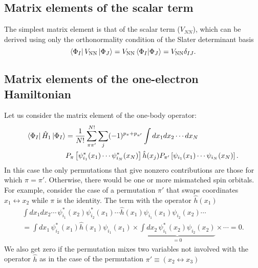 \documentclass[../Main/chem532-notes.tex]{subfiles}
\begin{document}
\subsection{Matrix elements of the scalar term}
The simplest matrix element is that of the scalar term ($V_{NN}$), which can be derived using only the orthonormality condition of the Slater determinant basis
\begin{equation}
\bra{\Phi_I} V_\mathrm{NN} \ket{\Phi_J}
= V_\mathrm{NN} \braket{\Phi_I | \Phi_J} = V_\mathrm{NN} \delta_{IJ}.
\end{equation}

\subsection{Matrix elements of the one-electron Hamiltonian}
Let us consider the matrix element of the one-body operator:
\begin{equation}
\begin{split}
\bra{\Phi_I} \hat{H}_1 \ket{\Phi_I} &= \frac{1}{N!}
\sum_{\pi \pi'}^{N!} \sum_j (-1)^{p_\pi + p_{\pi'}} \int dx_1 dx_2 \cdots dx_N \\
&
P_{\pi}\left[
\psi_{i_1}^{*}(x_1) \cdots \psi_{i_N}^{*}(x_N)
\right]
\hat{h}(x_j)
P_{\pi'}\left[
\psi_{i_1}(x_1) \cdots \psi_{i_N}(x_N)
\right].
\end{split}
\end{equation}
In this case the only permutations that give nonzero contributions are those for which $\pi = \pi'$.
Otherwise, there would be one or more mismatched spin orbitals. For example, consider the case of a permutation $\pi'$ that swaps coordinates $x_1 \leftrightarrow x_2$ while $\pi$ is the identity. The term with the operator $\hat{h}(x_1)$
\begin{equation}
\begin{split}
\int dx_1 dx_2 \cdots \,
\psi_{i_1}^{*}(x_2) \psi_{i_2}^{*}(x_1) \cdots
\hat{h}(x_1)
\psi_{i_1}(x_1) \psi_{i_2}(x_2)\cdots  \\
= \int dx_1 \, \psi_{i_2}^{*}(x_1) \hat{h}(x_1) \psi_{i_1}(x_1)
\times \underbrace{\int dx_2 \, \psi_{i_1}^{*}(x_2) \psi_{i_2}(x_2)}_{= 0} \times \cdots = 0.
\end{split}
\end{equation}
We also get zero if the permutation mixes two variables not involved with the operator $\hat{h}$ as in the case of the permutation $\pi' \equiv (x_2 \leftrightarrow x_3)$ 
\end{document}
